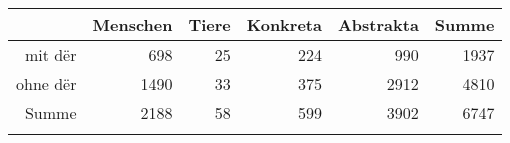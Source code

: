 \begin{tabular}{rrrrrr}
  \lsptoprule
 & Menschen & Tiere & Konkreta & Abstrakta & Summe \\ 
  \midrule
mit dër & 698 & 25 & 224 & 990 & 1937 \\ 
  ohne dër & 1490 & 33 & 375 & 2912 & 4810 \\ 
  Summe & 2188 & 58 & 599 & 3902 & 6747 \\ 
   \lspbottomrule
\end{tabular}
